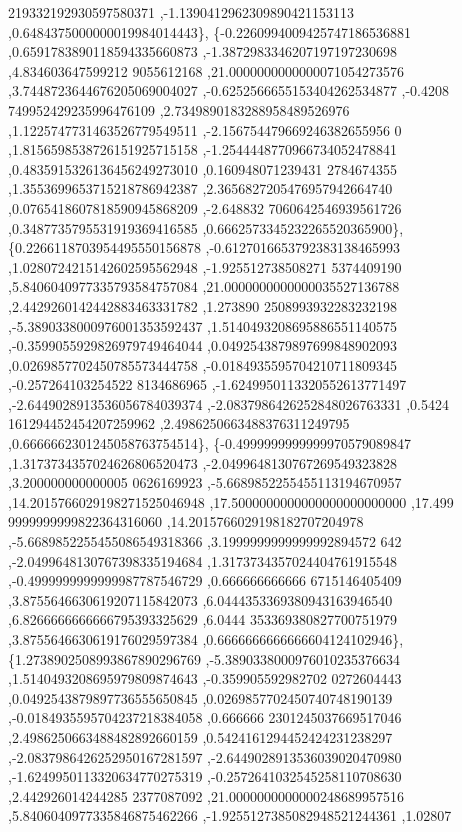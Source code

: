 \begin{DoxyCode}
      219332192930597580371 ,-1.1390412962309890421153113 ,0.6484375000000019984014443\},
\{-0.2260994009425747186536881 ,0.6591783890118594335660873 ,-1.3872983346207197197230698 ,4.834603647599212
      9055612168 ,21.0000000000000071054273576 ,3.7448723644676205069004027 ,-0.6252566655153404262534877 ,-0.4208
      749952429235996476109 ,2.7349890183288958489526976 ,1.1225747731463526779549511 ,-2.156754479669246382655956
      0 ,1.8156598538726151925715158 ,-1.2544448770966734052478841 ,0.4835915326136456249273010 ,0.160948071239431
      2784674355 ,1.3553699653715218786942387 ,2.3656827205476957942664740 ,0.0765418607818590945868209 ,-2.648832
      7060642546939561726 ,0.3487735795531919369416585 ,0.6662573345232265520365900\},
\{0.2266118703954495550156878 ,-0.6127016653792383138465993 ,1.0280724215142602595562948 ,-1.925512738508271
      5374409190 ,5.8406040977335793584757084 ,21.0000000000000035527136788 ,2.4429260142442883463331782 ,1.273890
      2508993932283232198 ,-5.3890338000976001353592437 ,1.5140493208695886551140575 ,-0.3599055929826979749464044
       ,0.0492543879897699848902093 ,0.0269857702450785573444758 ,-0.0184935595704210711809345 ,-0.257264103254522
      8134686965 ,-1.6249950113320552613771497 ,-2.6449028913536056784039374 ,-2.0837986426252848026763331 ,0.5424
      161294452454207259962 ,2.4986250663488376311249795 ,0.6666662301245058763754514\},
\{-0.4999999999999970579089847 ,1.3173734357024626806520473 ,-2.0499648130767269549323828 ,3.200000000000005
      0626169923 ,-5.6689852255455113194670957 ,14.2015766029198271525046948 ,17.5000000000000000000000000 ,17.499
      9999999999822364316060 ,14.2015766029198182707204978 ,-5.6689852255455086549318366 ,3.1999999999999992894572
      642 ,-2.0499648130767398335194684 ,1.3173734357024404761915548 ,-0.4999999999999987787546729 ,0.666666666666
      6715146405409 ,3.8755646630619207115842073 ,6.0444353369380943163946540 ,6.8266666666666795393325629 ,6.0444
      353369380827700751979 ,3.8755646630619176029597384 ,0.6666666666666604124102946\},
\{1.2738902508993867890296769 ,-5.3890338000976010235376634 ,1.5140493208695979809874643 ,-0.359905592982702
      0272604443 ,0.0492543879897736555650845 ,0.0269857702450740748190139 ,-0.0184935595704237218384058 ,0.666666
      2301245037669517046 ,2.4986250663488482892660159 ,0.5424161294452424231238297 ,-2.0837986426252950167281597 
      ,-2.6449028913536039020470980 ,-1.6249950113320634770275319 ,-0.2572641032545258110708630 ,2.442926014244285
      2377087092 ,21.0000000000000248689957516 ,5.8406040977335846875462266 ,-1.9255127385082948521244361 ,1.02807

\end{DoxyCode}

